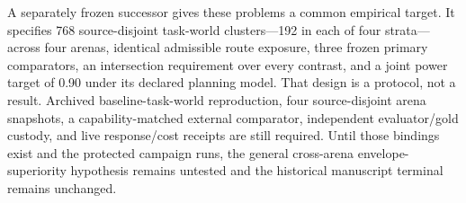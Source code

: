 A separately frozen successor gives these problems a common empirical target.
It specifies 768 source-disjoint task-world clusters---192 in each of four
strata---across four arenas, identical admissible route exposure, three frozen
primary comparators, an intersection requirement over every contrast, and a
joint power target of 0.90 under its declared planning model.  That design is a
protocol, not a result.  Archived baseline-task-world reproduction, four
source-disjoint arena snapshots, a capability-matched external comparator,
independent evaluator/gold custody, and live response/cost receipts are still
required.  Until those bindings exist and the protected campaign runs, the
general cross-arena envelope-superiority hypothesis remains untested and the
historical manuscript terminal remains unchanged.
